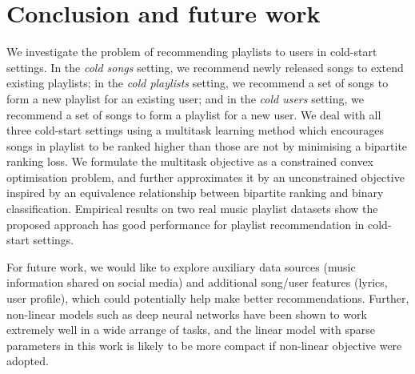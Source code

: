 \section{Conclusion and future work}

We investigate the problem of recommending playlists to users in cold-start settings.
In the {\it cold songs} setting, we recommend newly released songs to extend existing playlists;
in the {\it cold playlists} setting, we recommend a set of songs to form a new playlist for an existing user;
and in the {\it cold users} setting, we recommend a set of songs to form a playlist for a new user.
We deal with all three cold-start settings using a multitask learning method which encourages songs in playlist 
to be ranked higher than those are not by minimising a bipartite ranking loss. 
We formulate the multitask objective as a constrained convex optimisation problem, and further approximates it 
by an unconstrained objective inspired by an equivalence relationship between bipartite ranking and binary classification. 
Empirical results on two real music playlist datasets show the proposed approach 
has good performance for playlist recommendation in cold-start settings.

For future work, we would like to explore 
auxiliary data sources (\eg music information shared on social media) and additional song/user 
features (\eg lyrics, user profile), %
which could potentially help make better recommendations.
Further, non-linear models such as deep neural networks have been shown to work extremely well in a wide arrange of tasks,
and the linear model with sparse parameters in this work is likely to be more compact if non-linear objective were adopted.

